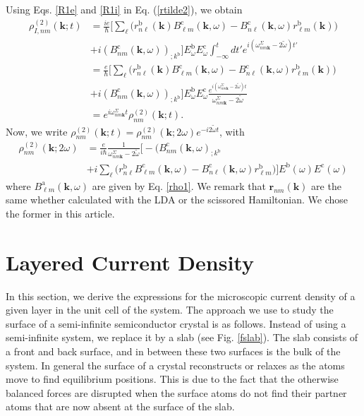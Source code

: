 Using Eqs. \eqref{R1e} and  \eqref{R1i} in Eq. (\ref{rtilde2}),
we obtain
\begin{align}\label{rtilde33}
\rho^{(2)}_{I,nm}(\mathbf{k};t)
&=
\frac{ie}{\hbar}
\bigg[
\sum_{\ell}
\Big(
r^{\mathrm{b}}_{n\ell}(\mathbf{k})
B^{\mathrm{c}}_{\ell m}(\mathbf{k},\omega)
-
B^{\mathrm{c}}_{n\ell}(\mathbf{k},\omega)
r^{\mathrm{b}}_{\ell m}(\mathbf{k})
\Big)
\nonumber \\
&+
i
(B^{\mathrm{c}}_{nm}(\mathbf{k},\omega))_{;k^{\mathrm{b}}}
\bigg]
E^{\mathrm{b}}_{\omega}E_{\omega}^{\mathrm{c}}
\int_{-\infty}^t dt'
e^{i(\omega^\Sigma_{nm\mathbf{k}}-2\tilde{\omega})t'}
\nonumber \\
&=
\frac{e}{\hbar}
\bigg[
\sum_{\ell}
\Big(
r^{\mathrm{b}}_{n\ell}(\mathbf{k})
B^{\mathrm{c}}_{\ell m}(\mathbf{k},\omega)
-
B^{\mathrm{c}}_{n\ell}(\mathbf{k},\omega)
r^{\mathrm{b}}_{\ell m}(\mathbf{k})
\Big)
\nonumber \\
&+
i
(B^{\mathrm{c}}_{nm}(\mathbf{k},\omega))_{;k^{\mathrm{b}}}
\bigg]
E^{\mathrm{b}}_{\omega}E_{\omega}^{\mathrm{c}}
\frac{e^{i(\omega^\Sigma_{nm\mathbf{k}}-2\tilde{\omega})t}}
{\omega^\Sigma_{nm\mathbf{k}}-2\tilde{\omega}}
\nonumber \\
&=
e^{i\omega^\Sigma_{nm\mathbf{k}}t}
\rho_{nm}^{(2)}(\mathbf{k};t)
.
\end{align}
Now, we write
$\rho_{nm}^{(2)}(\mathbf{k};t)=\rho_{nm}^{(2)}(\mathbf{k};2\omega)e^{-i2\tilde{\omega} t}$,
with
\begin{align}\label{rho2}
\rho_{nm}^{(2)}(\mathbf{k};2\omega)&=\frac{e}{i\hbar}\frac{1}{\omega^\Sigma_{nm\mathbf{k}}-2\tilde{\omega}}
\bigg[-(B_{nm}^{\mathrm{c}}(\mathbf{k},\omega)_{;k^{\mathrm{b}}}
\nonumber \\
&
+i\sum_\ell\Big(r_{n\ell}^{\mathrm{b}}B_{\ell m}^{\mathrm{c}}(\mathbf{k},\omega) - B_{n\ell}^{\mathrm{c}}(\mathbf{k},\omega)
  r_{\ell m}^{\mathrm{b}}\Big)
\bigg] 
E^{\mathrm{b}}(\omega)E^{\mathrm{c}}(\omega)
\end{align} 
where 
$B_{\ell m}^{\mathrm{a}}(\mathbf{k},\omega)$ are given by Eq. \eqref{rho1}. 
We remark that $\mathbf{r}_{nm}(\mathbf{k})$  are
the same whether calculated with the LDA or the scissored Hamiltonian. 
We chose the former in this article.

\section{Layered Current Density}\label{cd}

In this section, we derive the expressions for the microscopic current density
of a given layer in the unit cell of the system. The approach we use to study
the surface of a semi-infinite semiconductor crystal is as follows. Instead of
using a semi-infinite system, we replace it by a slab (see Fig. \ref{fslab}).
The slab consists of a front and back surface, and in between these two surfaces
is the bulk of the system. In general the surface of a crystal reconstructs or
relaxes as the atoms move to find equilibrium positions. This is due to the fact
that the otherwise balanced forces are disrupted when the surface atoms do not
find their partner atoms that are now absent at the surface of the slab.

